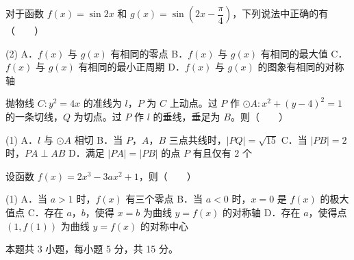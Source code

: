\begin{question}
对于函数 $f(x)=\sin2x$ 和 $g(x)=\sin\left(2x-\dfrac\pi4\right)$，下列说法中正确的有\mbox{（　　）}

\begin{gkopts}(2)
\task A．$f(x)$ 与 $g(x)$ 有相同的零点
\task B．$f(x)$ 与 $g(x)$ 有相同的最大值
\task C．$f(x)$ 与 $g(x)$ 有相同的最小正周期
\task D．$f(x)$ 与 $g(x)$ 的图象有相同的对称轴
\end{gkopts}

\end{question}
\begin{question}
抛物线 $C:y^{2}=4x$ 的准线为 $l$，$P$ 为 $C$ 上动点。过 $P$ 作 $\odot A:x^{2}+(y-4)^{2}=1$ 的一条切线，$Q$ 为切点。过 $P$ 作 $l$ 的垂线，垂足为 $B$。则\mbox{（　　）}

\begin{gkopts}(1)
\task A．$l$ 与 $\odot A$ 相切
\task B．当 $P$，$A$，$B$ 三点共线时，$|PQ|=\sqrt{15}$
\task C．当 $|PB|=2$ 时，$PA\perp AB$
\task D．满足 $|PA|=|PB|$ 的点 $P$ 有且仅有 $2$ 个
\end{gkopts}

\end{question}
\begin{question}
设函数 $f(x)=2x^{3}-3ax^{2}+1$，则\mbox{（　　）}

\begin{gkopts}(1)
\task A．当 $a>1$ 时，$f(x)$ 有三个零点
\task B．当 $a<0$ 时，$x=0$ 是 $f(x)$ 的极大值点
\task C．存在 $a$，$b$，使得 $x=b$ 为曲线 $y=f(x)$ 的对称轴
\task D．存在 $a$，使得点 $\left(1,f(1)\right)$ 为曲线 $y=f(x)$ 的对称中心
\end{gkopts}

\par\medskip

\end{question}

\begin{gktip}
本题共 3 小题，每小题 5 分，共 15 分。
\end{gktip}

